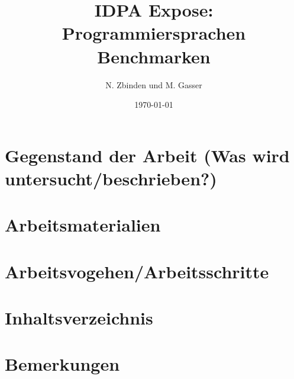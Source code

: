 \documentclass{fancydocument}
\title{IDPA Expose: Programmiersprachen Benchmarken}
\author{N. Zbinden und M. Gasser}
\date{\today}
\begin{document}
\maketitle
\thispagestyle{fancy}

\section*{Gegenstand der Arbeit (Was wird untersucht/beschrieben?)}



\section*{Arbeitsmaterialien}



\section*{Arbeitsvogehen/Arbeitsschritte}



\section*{Inhaltsverzeichnis}


\section*{Bemerkungen}
\end{document}
